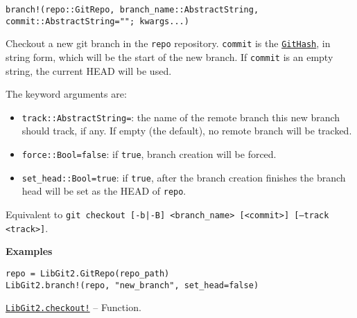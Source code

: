 \begin{adjustwidth}{2em}{0pt}


\begin{verbatim}
branch!(repo::GitRepo, branch_name::AbstractString, commit::AbstractString=""; kwargs...)
\end{verbatim}

Checkout a new git branch in the \texttt{repo} repository. \texttt{commit} is the \hyperlink{202290709580230708}{\texttt{GitHash}}, in string form, which will be the start of the new branch. If \texttt{commit} is an empty string, the current HEAD will be used.

The keyword arguments are:

\begin{itemize}
\item \texttt{track::AbstractString={\textquotedbl}{\textquotedbl}}: the name of the remote branch this new branch should track, if any. If empty (the default), no remote branch will be tracked.


\item \texttt{force::Bool=false}: if \texttt{true}, branch creation will be forced.


\item \texttt{set\_head::Bool=true}: if \texttt{true}, after the branch creation finishes the branch head will be set as the HEAD of \texttt{repo}.

\end{itemize}
Equivalent to \texttt{git checkout [-b|-B] <branch\_name> [<commit>] [--track <track>]}.

\textbf{Examples}


\begin{verbatim}
repo = LibGit2.GitRepo(repo_path)
LibGit2.branch!(repo, "new_branch", set_head=false)
\end{verbatim}



\end{adjustwidth}
\hypertarget{17667204238793225311}{} 
\hyperlink{17667204238793225311}{\texttt{LibGit2.checkout!}}  -- {Function.}


